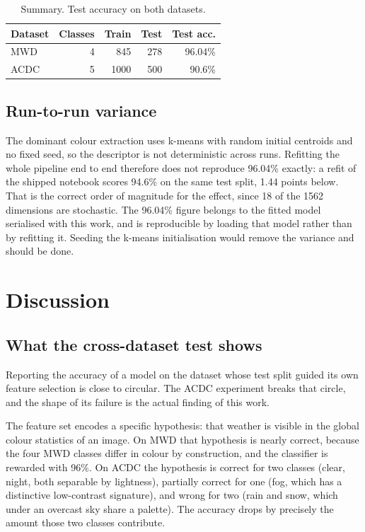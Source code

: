 \documentclass[10pt, conference, letterpaper]{IEEEtran}
\begin{document}
\begin{table}[t]
\centering
\caption{Summary. Test accuracy on both datasets.}
\label{tab:summary}
\begin{tabular}{lrrrr}
\toprule
Dataset & Classes & Train & Test & Test acc. \\
\midrule
MWD  & 4 & 845  & 278 & 96.04\% \\
ACDC & 5 & 1000 & 500 & 90.6\% \\
\bottomrule
\end{tabular}
\end{table}

\subsection{Run-to-run variance}

The dominant colour extraction uses k-means with random initial centroids and no fixed seed, so the descriptor is not deterministic across runs. Refitting the whole pipeline end to end therefore does not reproduce 96.04\% exactly: a refit of the shipped notebook scores 94.6\% on the same test split, 1.44 points below. That is the correct order of magnitude for the effect, since 18 of the 1562 dimensions are stochastic. The 96.04\% figure belongs to the fitted model serialised with this work, and is reproducible by loading that model rather than by refitting it. Seeding the k-means initialisation would remove the variance and should be done.

\section{Discussion}

\subsection{What the cross-dataset test shows}

Reporting the accuracy of a model on the dataset whose test split guided its own feature selection is close to circular. The ACDC experiment breaks that circle, and the shape of its failure is the actual finding of this work.

The feature set encodes a specific hypothesis: that weather is visible in the global colour statistics of an image. On MWD that hypothesis is nearly correct, because the four MWD classes differ in colour by construction, and the classifier is rewarded with 96\%. On ACDC the hypothesis is correct for two classes (clear, night, both separable by lightness), partially correct for one (fog, which has a distinctive low-contrast signature), and wrong for two (rain and snow, which under an overcast sky share a palette). The accuracy drops by precisely the amount those two classes contribute.
\end{document}
